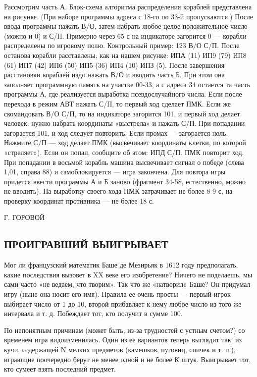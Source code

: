 \documentclass[11pt,a4paper,oneside]{article}
\begin{document}
Рассмотрим часть А. Блок-схема алгоритма распределения кораблей представлена на рисунке. (При наборе программы адреса с 18-го по 33-й пропускаются.) После ввода программы нажать В/О, затем набрать любое целое положительное число (можно и 0) и С/П. Примерно через 65 с на индикаторе загорится 0 — корабли распределены по игровому полю. Контрольный пример: 123 В/О С/П. После останова корабли расставлены, как на нашем рисунке: ИПА (11) ИП9 (79) ИП8 (61) ИП7 (42) ИП6 (50) ИП5 (36) ИП4 (10) ИПЗ (5). После завершения расстановки кораблей надо нажать В/О и вводить часть Б. При этом она заполняет программную память на участке 00-33, а с адреса 34 остается та часть программы А, где реализуется выработка псевдослучайного числа. Если после перехода в режим АВТ нажать С/П, то первый ход сделает ПМК. Если же скомандовать В/О С/П, то на индикаторе загорится 101, и первый ход делает человек: нужно набрать координаты «выстрела» и нажать С/П. При попадании загорается 101, и ход следует повторить. Если промах — загорается ноль. Нажмите С/П — ход делает ПМК (высвечивает координаты клетки, по которой «стреляет»). Если он попал, сообщите об этом: ИПД С/П. ПМК повторит ход. При попадании в восьмой корабль машина высвечивает сигнал о победе (слева 1,01, справа 88) и самоблокируется — игра закончена. Для повтора игры придется ввести программы А и Б заново (фрагмент 34-58, естественно, можно не вводить). На выработку своего хода ПМК затрачивает не более 8-9 с, на проверку координат противника — не более 18 с.

Г. ГОРОВОЙ

\subsection{ПРОИГРАВШИЙ ВЫИГРЫВАЕТ}
Мог ли французский математик Баше де Мезирьяк в 1612 году предполагать, какие последствия вызовет в XX веке его изобретение? Ничего не поделаешь, мы сами часто «не ведаем, что творим». Так что же «натворил» Баше? Он придумал игру (ныне она носит его имя). Правила ее очень просты — первый игрок выбирает число от 1 до 10, второй прибавляет к нему любое число из того же интервала и т. д. Побеждает тот, кто получит в сумме 100.

По непонятным причинам (может быть, из-за трудностей с устным счетом?) со временем игра видоизменилась. Один из ее вариантов теперь выглядит так: из кучи, содержащей N мелких предметов (камешков, пуговиц, спичек и т. п.), играющие поочередно берут не менее одной и не более К штук. Выигрывает тот, кто сумеет взять последний предмет.
\end{document}

